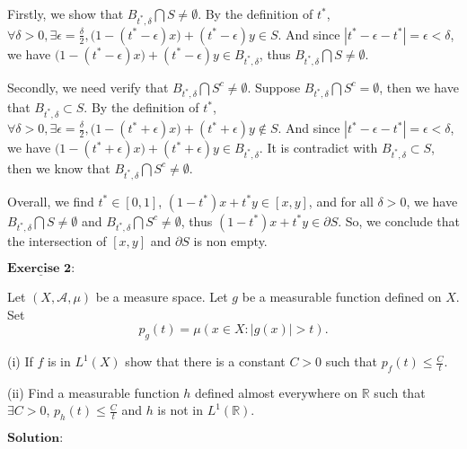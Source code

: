 \documentclass[12pt,a4paper]{ctexart}
\begin{document}
Firstly, we show that $B_{t^{*}, \delta} \bigcap S \neq \emptyset$. By the definition of $t^{*}$, $\forall \delta > 0, \exists \epsilon = \frac{\delta}{2}, \big(1 - (t^{*} - \epsilon)x \big) + (t^{*} - \epsilon) y \in S$. And since $|t^{*} - \epsilon - t^{*}| = \epsilon < \delta$, we have $\big(1 - (t^{*} - \epsilon)x \big) + (t^{*} - \epsilon) y \in B_{t^{*}, \delta}$, thus $B_{t^{*}, \delta} \bigcap S \neq \emptyset$.

Secondly, we need verify that $B_{t^{*}, \delta} \bigcap S^{c} \neq \emptyset$. Suppose $B_{t^{*}, \delta} \bigcap S^{c} = \emptyset$, then we have that $B_{t^{*}, \delta} \subset S$. By the definition of $t^{*}$, $\forall \delta > 0, \exists \epsilon = \frac{\delta}{2}, \big(1 - (t^{*} + \epsilon)x \big) + (t^{*} + \epsilon) y \notin S$. And since $|t^{*} - \epsilon - t^{*}| = \epsilon < \delta$, we have $\big(1 - (t^{*} + \epsilon)x \big) + (t^{*} + \epsilon) y \in B_{t^{*}, \delta}$. It is contradict with $B_{t^{*}, \delta} \subset S$, then we know that $B_{t^{*}, \delta} \bigcap S^{c} \neq \emptyset$.

Overall, we find $t^{*} \in [0, 1]$, $(1- t^{*})x + t^{*} y \in [x, y]$, and for all $\delta > 0$, we have $B_{t^{*}, \delta} \bigcap S \neq \emptyset$ and $B_{t^{*}, \delta} \bigcap S^{c} \neq \emptyset$, thus $(1- t^{*})x + t^{*} y \in \partial{S}$. So, we conclude that the intersection of $[x, y]$ and $\partial S$ is non empty.

\newpage

$\underline{\textbf{Exercise 2:}}$

Let $(X, \mathcal{A}, \mu)$ be a measure space. Let $g$ be a measurable function defined on $X$. Set 
\begin{equation*}
    p_{g} (t) = \mu ({x \in X : |g(x)| > t}).
\end{equation*}

(i) If $f$ is in $L^{1}(X)$ show that there is a constant $C > 0$ such that $p_{f}(t) \leq \frac{C}{t}$.

(ii) Find a measurable function $h$ defined almost everywhere on $\mathbb{R}$ such that $\exists C > 0$, $p_{h} (t) \leq \frac{C}{t}$ and $h$ is not in $L^{1}(\mathbb{R})$.

\vspace{8pt}
$\textbf{Solution:}$
\end{document}
